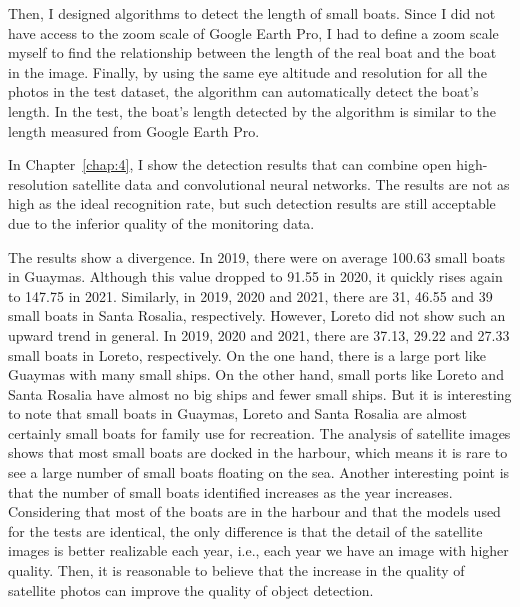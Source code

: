 Then, I designed algorithms to detect the length of small boats. Since I did not have access to the zoom scale of Google Earth Pro, I had to define a zoom scale myself to find the relationship between the length of the real boat and the boat in the image. Finally, by using the same eye altitude and resolution for all the photos in the test dataset, the algorithm can automatically detect the boat's length. In the test, the boat's length detected by the algorithm is similar to the length measured from Google Earth Pro.

In Chapter~\ref{chap:4}, I show the detection results that can combine open high-resolution satellite data and convolutional neural networks. The results are not as high as the ideal recognition rate, but such detection results are still acceptable due to the inferior quality of the monitoring data. 

The results show a divergence. In 2019, there were on average 100.63 small boats in Guaymas. Although this value dropped to 91.55 in 2020, it quickly rises again to 147.75 in 2021. Similarly, in 2019, 2020 and 2021, there are 31, 46.55 and 39 small boats in Santa Rosalia, respectively. However, Loreto did not show such an upward trend in general. In 2019, 2020 and 2021, there are 37.13, 29.22 and 27.33 small boats in Loreto, respectively. On the one hand, there is a large port like Guaymas with many small ships. On the other hand, small ports like Loreto and Santa Rosalia have almost no big ships and fewer small ships. But it is interesting to note that small boats in Guaymas, Loreto and Santa Rosalia are almost certainly small boats for family use for recreation. The analysis of satellite images shows that most small boats are docked in the harbour, which means it is rare to see a large number of small boats floating on the sea. Another interesting point is that the number of small boats identified increases as the year increases. Considering that most of the boats are in the harbour and that the models used for the tests are identical, the only difference is that the detail of the satellite images is better realizable each year, i.e., each year we have an image with higher quality. Then, it is reasonable to believe that the increase in the quality of satellite photos can improve the quality of object detection.\\



 

